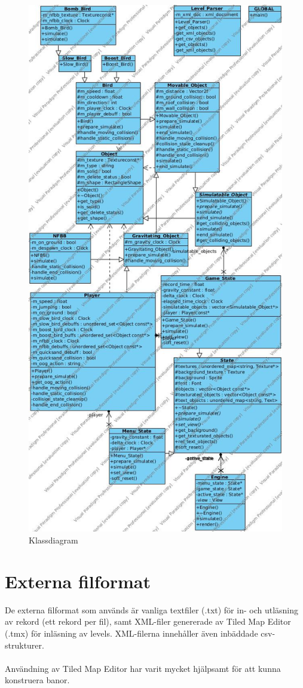 \documentclass{TDP003mall}
\begin{document}
\begin{figure}[H]
    \centering
    \includegraphics[scale=0.5]{class_diagram}
    \caption{Klassdiagram}
    \label{Klassdiagram}
\end{figure}
\newpage
\section{Externa filformat}
De externa filformat som används är vanliga textfiler (.txt) för in- och utläsning av rekord (ett rekord per fil), samt XML-filer genererade av Tiled Map Editor (.tmx) för inläsning av levels. XML-filerna innehåller även inbäddade csv-strukturer.
\\\\
Användning av Tiled Map Editor har varit mycket hjälpsamt för att kunna konstruera banor.
\end{document}
